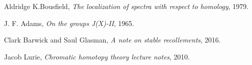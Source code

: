 \documentclass[a4paper]{article} %
\theoremstyle{definition}
\begin{document}
\begin{thebibliography}{9}

  Aldridge K.Bousfield,
  \textit{The localization of spectra with respect to homology},
  1979.

  J. F. Adams,
  \textit{On the groups J(X)-II},
  1965.

    Clark Barwick and Saul Glasman,
    \textit{A note on stable recollements},
    2016.

  Jacob Lurie,
  \textit{Chromatic homotopy theory lecture notes},
  2010.

\end{thebibliography}
\end{document}
